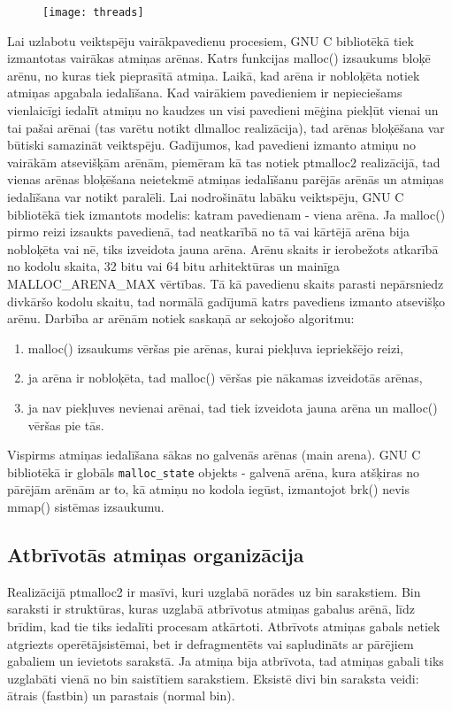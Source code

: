\begin{figure}[h]
\begin{center}
\texttt{[image: threads]}
\end{center}
\caption{\textbf{\fontsize{11}{12}\selectfont {Arēnas GNU C bibliotēkā (versija 2.3)}}}
\end{figure}
Lai uzlabotu veiktspēju vairākpavedienu procesiem, GNU C bibliotēkā tiek izmantotas vairākas atmiņas arēnas. 
Katrs funkcijas malloc() izsaukums bloķē arēnu, no kuras tiek pieprasītā atmiņa. 
Laikā, kad arēna ir nobloķēta notiek atmiņas apgabala iedalīšana.
Kad vairākiem pavedieniem ir nepieciešams vienlaicīgi iedalīt atmiņu no kaudzes un visi pavedieni mēģina piekļūt vienai un tai pašai arēnai (tas varētu notikt dlmalloc realizācija), tad arēnas bloķēšana var būtiski samazināt veiktspēju.
Gadījumos, kad pavedieni izmanto atmiņu no vairākām atsevišķām arēnām, piemēram kā tas notiek ptmalloc2 realizācijā, tad vienas arēnas bloķēšana neietekmē atmiņas iedalīšanu parējās arēnās un atmiņas iedalīšana var notikt paralēli.
Lai nodrošinātu labāku veiktspēju, GNU C bibliotēkā tiek izmantots modelis: katram pavedienam - viena arēna. 
Ja malloc() pirmo reizi izsaukts pavedienā, tad neatkarībā no tā vai kārtējā arēna bija nobloķēta vai nē, tiks izveidota jauna arēna.
Arēnu skaits ir ierobežots atkarībā no kodolu skaita, 32 bitu vai 64 bitu arhitektūras un mainīga MALLOC\_ARENA\_MAX vērtības.
Tā kā pavedienu skaits parasti nepārsniedz divkāršo kodolu skaitu, tad normālā gadījumā katrs pavediens izmanto atsevišķo arēnu. 
Darbība ar arēnām notiek saskaņā ar sekojošo algoritmu: 
\begin{enumerate}
\item malloc() izsaukums vēršas pie arēnas, kurai piekļuva iepriekšējo reizi,
\item ja arēna ir nobloķēta, tad malloc() vēršas pie nākamas izveidotās arēnas,
\item ja nav piekļuves nevienai arēnai, tad tiek izveidota jauna arēna un malloc() vēršas pie tās.
\end{enumerate}
Vispirms atmiņas iedalīšana sākas no galvenās arēnas (main arena). 
GNU C bibliotēkā ir globāls \texttt{malloc\_state} objekts - galvenā arēna, kura atšķiras no pārējām arēnām ar to, kā atmiņu no kodola iegūst, izmantojot brk() nevis  mmap() sistēmas izsaukumu. 


 \subsection{Atbrīvotās atmiņas organizācija}
 \label{subsec:bin_saraksti}
Realizācijā ptmalloc2 ir masīvi, kuri uzglabā norādes uz bin sarakstiem.
Bin saraksti ir struktūras, kuras uzglabā atbrīvotus atmiņas gabalus arēnā, līdz brīdim, kad tie tiks iedalīti procesam atkārtoti.
Atbrīvots atmiņas gabals netiek atgriezts operētājsistēmai, bet ir defragmentēts vai sapludināts ar pārējiem gabaliem un ievietots sarakstā. 
Ja atmiņa bija atbrīvota, tad atmiņas gabali tiks uzglabāti vienā no bin saistītiem sarakstiem.
Eksistē divi bin saraksta veidi: ātrais (fastbin) un parastais (normal bin).


